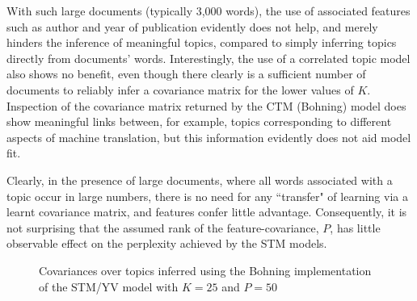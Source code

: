 With such large documents (typically 3,000 words), the use of associated features such as author and year of publication evidently does not help, and merely hinders the inference of meaningful topics, compared to simply inferring topics directly from documents' words. Interestingly, the use of a correlated topic model also shows no benefit, even though there clearly is a sufficient number of documents to reliably infer a covariance matrix for the lower values of $K$. Inspection of the covariance matrix returned by the CTM (Bohning) model does show meaningful links between, for example, topics corresponding to different aspects of machine translation, but this information evidently does not aid model fit.

Clearly, in the presence of large documents, where all words associated with a topic occur in large numbers, there is no need for any ``transfer" of learning via a learnt covariance matrix, and features confer little advantage. Consequently, it is not surprising that the assumed rank of the feature-covariance, $P$, has little observable effect on the perplexity achieved by the STM models.


\begin{figure}
\centering     %
{}
\caption{Covariances over topics inferred using the Bohning implementation of the STM/YV model with $K=25$ and $P=50$}
\label{fig:acl-and-tweet-cov}
\end{figure}

